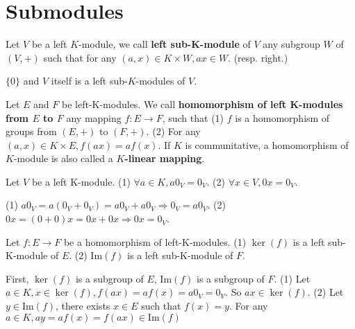 \section{Submodules}
\begin{definitionenv}
    Let $V$ be a left $K$-module,  we call \textbf{left sub-K-module} of $V$ any subgroup $W$ of $(V, +)$ such that for any $(a, x)\in K\times W, ax\in W$. (resp. right.)
\end{definitionenv}
\begin{exampleenv}
    $\{0\}$ and $V$ itself is a left sub-$K$-modules of $V$.
\end{exampleenv}
\begin{definitionenv}
    Let $E$ and $F$ be left-K-modules. We call \textbf{homomorphism of left K-modules from $E$ to $F$} any mapping $f:E\rightarrow F$,  such that 
    \newline
    (1) $f$ is a homomorphism of groups from $(E, +)$ to $(F, +)$.
    \newline
    (2) For any $(a, x)\in K\times E, f(ax)=af(x)$.
    \newline
    If $K$ is communitative,  a homomorphism of $K$-module is also called a \textbf{$K$-linear mapping}.
\end{definitionenv}
\begin{lemmaenv}
    Let $V$ be a left K-module.
    \newline
    (1) $\forall a\in K, a0_V=0_V$.
    \newline
    (2) $\forall x\in V, 0x=0_V$.
\end{lemmaenv}
\begin{proofenv}
    \quad
    \newline
    (1) $a0_V=a(0_V+0_V)=a0_V+a0_V\Rightarrow 0_V=a0_V$.
    \newline
    (2) $0x=(0+0)x=0x+0x\Rightarrow 0x=0_V$.
\end{proofenv}
\begin{theoremenv}
    Let $f:E\rightarrow F$ be a homomorphism of left-K-modules.
    \newline 
    (1) $\ker(f)$ is a left sub-K-module of $E$.
    \newline
    (2) $\mathrm{Im}(f)$ is a left sub-K-module of $F$. 
\end{theoremenv}
\begin{proofenv}
    First,  $\ker(f)$ is a subgroup of $E$,  $\mathrm{Im}(f)$ is a subgroup of $F$.
    \newline
    (1) Let $a\in K,  x\in \ker(f),  f(ax)=af(x)=a0_V=0_V$. So $ax\in \ker(f)$.
    \newline
    (2) Let $y\in \mathrm{Im}(f)$,  there exists $x\in E$ such that $f(x)=y$. For any $a\in K, ay=af(x)=f(ax)\in \mathrm{Im}(f)$
\end{proofenv}
